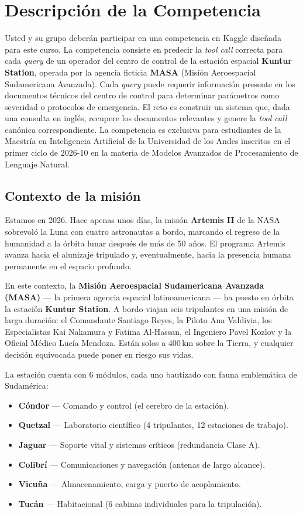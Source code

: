 \documentclass{article}
\begin{document}
\section{Descripción de la Competencia}
Usted y su grupo deberán participar en una competencia en Kaggle diseñada para este curso. La competencia consiste en predecir la \textit{tool call} correcta para cada \textit{query} de un operador del centro de control de la estación espacial \textbf{Kuntur Station}, operada por la agencia ficticia \textbf{MASA} (Misión Aeroespacial Sudamericana Avanzada). Cada \textit{query} puede requerir información presente en los documentos técnicos del centro de control para determinar parámetros como severidad o protocolos de emergencia. El reto es construir un sistema que, dada una consulta en inglés, recupere los documentos relevantes y genere la \textit{tool call} canónica correspondiente. La competencia es exclusiva para estudiantes de la Maestría en Inteligencia Artificial de la Universidad de los Andes inscritos en el primer ciclo de 2026-10 en la materia de Modelos Avanzados de Procesamiento de Lenguaje Natural.

\subsection{Contexto de la misión}
Estamos en 2026. Hace apenas unos días, la misión \textbf{Artemis II} de la NASA sobrevoló la Luna con cuatro astronautas a bordo, marcando el regreso de la humanidad a la órbita lunar después de más de 50 años. El programa Artemis avanza hacia el alunizaje tripulado y, eventualmente, hacia la presencia humana permanente en el espacio profundo.

En este contexto, la \textbf{Misión Aeroespacial Sudamericana Avanzada (MASA)} --- la primera agencia espacial latinoamericana --- ha puesto en órbita la estación \textbf{Kuntur Station}. A bordo viajan seis tripulantes en una misión de larga duración: el Comandante Santiago Reyes, la Piloto Ana Valdivia, los Especialistas Kai Nakamura y Fatima Al-Hassan, el Ingeniero Pavel Kozlov y la Oficial Médico Lucía Mendoza. Están solos a 400\,km sobre la Tierra, y cualquier decisión equivocada puede poner en riesgo sus vidas.

La estación cuenta con 6 módulos, cada uno bautizado con fauna emblemática de Sudamérica:
\begin{itemize}[noitemsep]
    \item \textbf{Cóndor} --- Comando y control (el cerebro de la estación).
    \item \textbf{Quetzal} --- Laboratorio científico (4 tripulantes, 12 estaciones de trabajo).
    \item \textbf{Jaguar} --- Soporte vital y sistemas críticos (redundancia Clase A).
    \item \textbf{Colibrí} --- Comunicaciones y navegación (antenas de largo alcance).
    \item \textbf{Vicuña} --- Almacenamiento, carga y puerto de acoplamiento.
    \item \textbf{Tucán} --- Habitacional (6 cabinas individuales para la tripulación).
\end{itemize}
\end{document}
